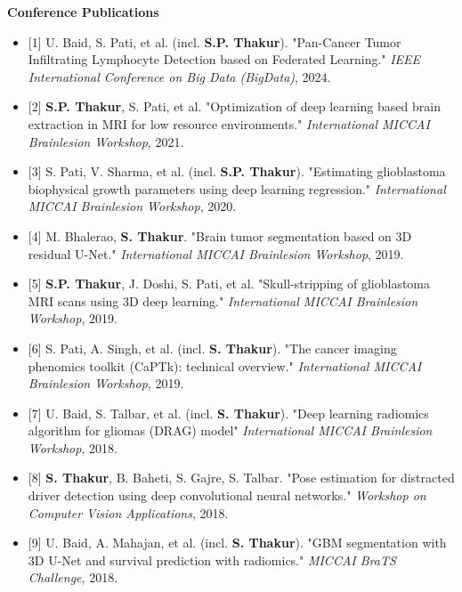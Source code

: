 \documentclass[letterpaper,11pt]{article}
\newcommand{\resumeItem}[1]{
  \item\small{
    {#1 \vspace{-2pt}}
  }
}
\newcommand{\resumeItemListStart}{\begin{itemize}}
\newcommand{\resumeItemListEnd}{\end{itemize}\vspace{-5pt}}
\begin{document}
    \item\small{\textbf{Conference Publications}}
      \resumeItemListStart
        \resumeItem{[1] U. Baid, S. Pati, et al. (incl. \textbf{S.P. Thakur}). "Pan-Cancer Tumor Infiltrating Lymphocyte Detection based on Federated Learning." \textit{IEEE International Conference on Big Data (BigData)}, 2024.}
        \resumeItem{[2] \textbf{S.P. Thakur}, S. Pati, et al. "Optimization of deep learning based brain extraction in MRI for low resource environments." \textit{International MICCAI Brainlesion Workshop}, 2021.}
        \resumeItem{[3] S. Pati, V. Sharma, et al. (incl. \textbf{S.P. Thakur}). "Estimating glioblastoma biophysical growth parameters using deep learning regression." \textit{International MICCAI Brainlesion Workshop}, 2020.}
        \resumeItem{[4] M. Bhalerao, \textbf{\textbf{S. Thakur}}. "Brain tumor segmentation based on 3D residual U-Net." \textit{International MICCAI Brainlesion Workshop}, 2019.}
        \resumeItem{[5] \textbf{S.P. Thakur}, J. Doshi, S. Pati, et al. "Skull-stripping of glioblastoma MRI scans using 3D deep learning." \textit{International MICCAI Brainlesion Workshop}, 2019.}
        \resumeItem{[6] S. Pati, A. Singh, et al. (incl. \textbf{\textbf{S. Thakur}}). "The cancer imaging phenomics toolkit (CaPTk): technical overview." \textit{International MICCAI Brainlesion Workshop}, 2019.}
        \resumeItem{[7] U. Baid, S. Talbar, et al. (incl. \textbf{\textbf{S. Thakur}}). "Deep learning radiomics algorithm for gliomas (DRAG) model" \textit{International MICCAI Brainlesion Workshop}, 2018.}
        \resumeItem{[8] \textbf{\textbf{S. Thakur}}, B. Baheti, S. Gajre, S. Talbar. "Pose estimation for distracted driver detection using deep convolutional neural networks." \textit{Workshop on Computer Vision Applications}, 2018.}
        \resumeItem{[9] U. Baid, A. Mahajan, et al. (incl. \textbf{\textbf{S. Thakur}}). "GBM segmentation with 3D U-Net and survival prediction with radiomics." \textit{MICCAI BraTS Challenge}, 2018.}
      \resumeItemListEnd
      
\end{document}
